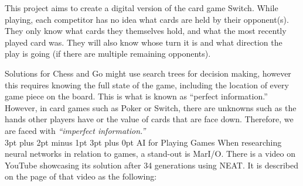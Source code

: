 \documentclass[12pt,a4paper]{article}
\makeatletter
\renewcommand\subsection{\@startsection {subsection}{1}{2mm} %
                               {3pt plus 2pt minus 1pt} %
                               {3pt plus 0pt} %
                               {\normalfont\bfseries}}
\makeatother
\begin{document}
This project aims to create a digital version of the card game Switch. While playing, each competitor has no idea what cards are held by their opponent(s). They only know what cards they themselves hold, and what the most recently played card was. They will also know whose turn it is and what direction the play is going (if there are multiple remaining opponents). 

Solutions for Chess and Go might use search trees for decision making, however this requires knowing the full state of the game, including the location of every game piece on the board. This is what is known as \enquote{perfect information.} However, in card games such as Poker or Switch, there are unknowns such as the hands other players have or the value of cards that are face down. Therefore, we are faced with \textit{\enquote{imperfect information.}}\\







\subsection{AI for Playing Games}
When researching neural networks in relation to games, a stand-out is MarI/O. There is a video on YouTube showcasing its solution after 34 generations using NEAT. It is described on the page of that video as the following:\\
\end{document}

